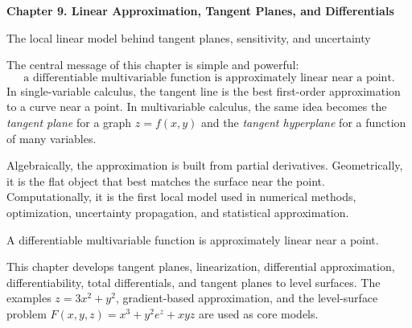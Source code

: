 \documentclass[11pt]{article}
\begin{document}
\begin{center}
  {\LARGE\bfseries Chapter 9. Linear Approximation, Tangent Planes, and Differentials\par}
  \vspace{0.3em}
  {\large The local linear model behind tangent planes, sensitivity, and uncertainty\par}
\end{center}

\begin{chapteroverviewbox}
The central message of this chapter is simple and powerful:
\[
\text{a differentiable multivariable function is approximately linear near a point.}
\]
In single-variable calculus, the tangent line is the best first-order approximation to a curve near a point. In multivariable calculus, the same idea becomes the \emph{tangent plane} for a graph $z=f(x,y)$ and the \emph{tangent hyperplane} for a function of many variables.

Algebraically, the approximation is built from partial derivatives. Geometrically, it is the flat object that best matches the surface near the point. Computationally, it is the first local model used in numerical methods, optimization, uncertainty propagation, and statistical approximation.
\end{chapteroverviewbox}

\begin{importantbox}
A differentiable multivariable function is approximately linear near a point.
\end{importantbox}

\begin{notebox}
This chapter develops tangent planes, linearization, differential approximation, differentiability, total differentials, and tangent planes to level surfaces. The examples $z=3x^2+y^2$, gradient-based approximation, and the level-surface problem $F(x,y,z)=x^3+y^2e^z+xyz$ are used as core models.
\end{notebox}
\end{document}
